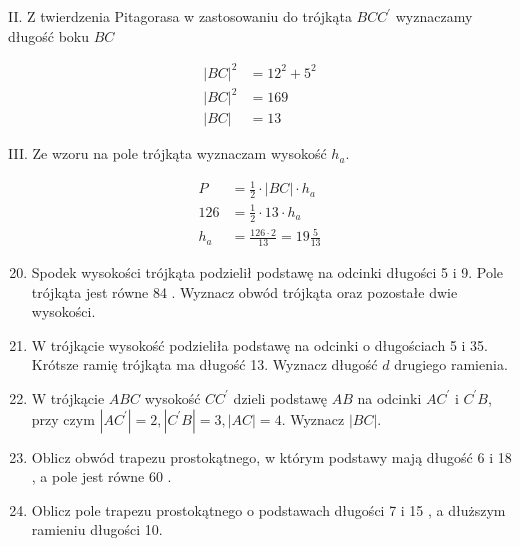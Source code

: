 \documentclass[10pt]{article}
\begin{document}
II. Z twierdzenia Pitagorasa w zastosowaniu do trójkąta \(B C C^{\prime}\) wyznaczamy długość boku \(B C\)

\[
\begin{aligned}
|B C|^{2} & =12^{2}+5^{2} \\
|B C|^{2} & =169 \\
|B C| & =13
\end{aligned}
\]

III. Ze wzoru na pole trójkąta wyznaczam wysokość \(h_{a}\).

\[
\begin{aligned}
P & =\frac{1}{2} \cdot|B C| \cdot h_{a} \\
126 & =\frac{1}{2} \cdot 13 \cdot h_{a} \\
h_{a} & =\frac{126 \cdot 2}{13}=19 \frac{5}{13}
\end{aligned}
\]

\begin{enumerate}
  \setcounter{enumi}{19}
  \item Spodek wysokości trójkąta podzielił podstawę na odcinki długości 5 i 9. Pole trójkąta jest równe 84 . Wyznacz obwód trójkąta oraz pozostałe dwie wysokości.
  \item W trójkącie wysokość podzieliła podstawę na odcinki o długościach 5 i 35. Krótsze ramię trójkąta ma długość 13. Wyznacz długość \(d\) drugiego ramienia.
  \item W trójkącie \(A B C\) wysokość \(C C^{\prime}\) dzieli podstawę \(A B\) na odcinki \(A C^{\prime}\) i \(C^{\prime} B\), przy czym \(\left|A C^{\prime}\right|=2,\left|C^{\prime} B\right|=3,|A C|=4\). Wyznacz \(|B C|\).
  \item Oblicz obwód trapezu prostokątnego, w którym podstawy mają długość 6 i 18 , a pole jest równe 60 .
  \item Oblicz pole trapezu prostokątnego o podstawach długości 7 i 15 , a dłuższym ramieniu długości 10.
\end{enumerate}
\end{document}
